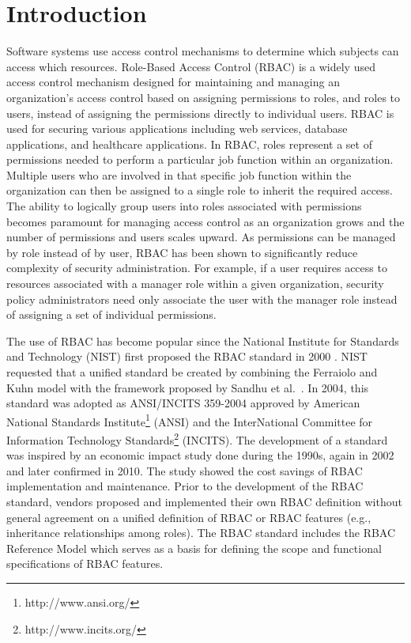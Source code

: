 \section{Introduction} \label{sec:introduction}

Software systems use access control mechanisms to determine which subjects can access which resources.
Role-Based Access Control (RBAC) is a widely used access control mechanism designed for maintaining and managing an organization's  access control based on assigning permissions to roles, and roles to users, instead of assigning the permissions directly to individual users.
RBAC is used for securing various applications including web services, database applications, and healthcare applications. 
In RBAC, roles represent a set of permissions needed to perform a particular job function within an organization.  
Multiple users who are involved in that specific job function within the organization can then be assigned to a single role to inherit the required access. 
The ability to logically group users into roles associated with permissions becomes paramount for managing access control as an organization grows and the number of permissions and users scales upward.
As permissions can be managed by role instead of by user, RBAC has been shown to significantly reduce complexity of security administration\cite{impact2002}.
For example, if a user requires access to resources associated with a manager role within a given organization, security policy administrators need only associate the user with the manager role instead of assigning a set of individual permissions.

The use of RBAC has become popular since the National Institute for Standards and Technology (NIST) first proposed the RBAC standard in 2000 \cite{sandhu2000nist}.
NIST requested that a unified standard be created by combining the Ferraiolo and Kuhn model \cite{ferraiolokuhn} with the framework proposed by Sandhu et al.~\cite{sandhu1996role}.  
In 2004, this standard was adopted as ANSI/INCITS 359-2004 approved by American National Standards Institute\footnote{http://www.ansi.org/} (ANSI) and the InterNational Committee for Information Technology Standards\footnote{http://www.incits.org/} (INCITS).
The development of a standard was inspired by an economic impact study done during the 1990s\cite{impact1996}, again in 2002\cite{impact2002} and later confirmed in 2010\cite{o20102010}. 
The study showed the cost savings of RBAC implementation and maintenance. 
Prior to the development of the RBAC standard, vendors proposed and implemented their own RBAC definition without general agreement on a unified definition of RBAC or RBAC features (e.g., inheritance relationships among roles). 
The RBAC standard includes the RBAC Reference Model which serves as a basis for defining the scope and functional specifications of RBAC features.

